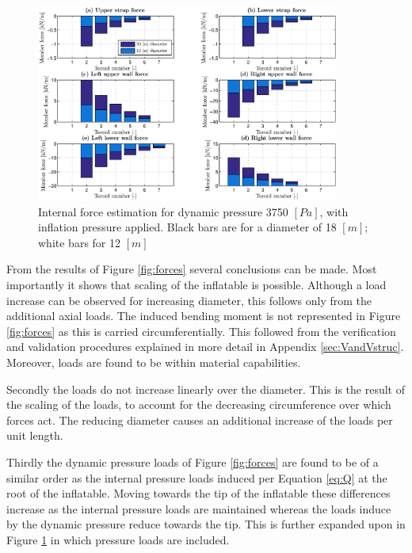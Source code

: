 \begin{figure}[h]
	\centering
	\includegraphics[width=0.89\textwidth]{./Figure/Structure/forces_test.eps}
	\caption[{Internal force estimation for dynamic pressure 3750 $[Pa]$, with inflation pressure applied}]{Internal force estimation for dynamic pressure 3750 $[Pa]$, with inflation pressure applied. Black bars are for a diameter of 18 $[m]$; white bars for 12 $[m]$}
	\label{fig:forcesp}
\vspace{-2mm}
\end{figure}

From the results of Figure \ref{fig:forces} several conclusions can be made. Most importantly it shows that scaling of the inflatable is possible. Although a load increase can be observed for increasing diameter, this follows only from the additional axial loads. The induced bending moment is not represented in Figure \ref{fig:forces} as this is carried circumferentially. This followed from the verification and validation procedures explained in more detail in Appendix \ref{sec:VandVstruc}. Moreover, loads are found to be within material capabilities.

Secondly the loads do not increase linearly over the diameter. This is the result of the scaling of the loads, to account for the decreasing circumference over which forces act. The reducing diameter causes an additional increase of the loads per unit length.

Thirdly the dynamic pressure loads of Figure \ref{fig:forces} are found to be of a similar order as the internal pressure loads induced per Equation \ref{eq:Q} at the root of the inflatable. Moving towards the tip of the inflatable these differences increase as the internal pressure loads are maintained whereas the loads induce by the dynamic pressure reduce towards the tip. This is further expanded upon in Figure \ref{fig:forcesp} in which pressure loads are included.

